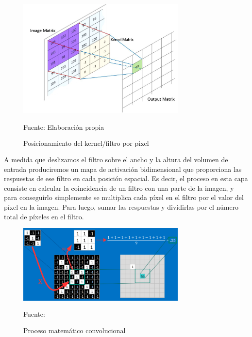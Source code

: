 		\begin{figure}[H]
		\begin{center}
		\includegraphics[width=0.75\textwidth]{images/marcoteorico/Convolution_calculation1}
		\end{center}
		\begin{center}
		\caption{\small{Posicionamiento del kernel/filtro por pixel}}
		{\small{Fuente: Elaboración propia}}
		\end{center}
		\vspace{-1.9em}
		\end{figure}

		A medida que deslizamos el filtro sobre el ancho y la altura del volumen de entrada produciremos un mapa de activación bidimensional que proporciona las respuestas de ese filtro en cada posición espacial. Es decir, el proceso en esta capa consiste en calcular la coincidencia de un filtro con una parte de la imagen, y para conseguirlo simplemente se multiplica cada píxel en el filtro por el valor del píxel en la imagen. Para luego, sumar las respuestas y dividirlas por el número total de píxeles en el filtro.

		\begin{figure}[H]
		\begin{center}
		\includegraphics[width=0.75\textwidth]{images/marcoteorico/conv_filt1}
		\end{center}
		\begin{center}
		\caption{\small{Proceso matemático convolucional}}
		{\small{Fuente: \cite{Rohrer}}}
		\end{center}
		\vspace{-1em}
		\end{figure}

